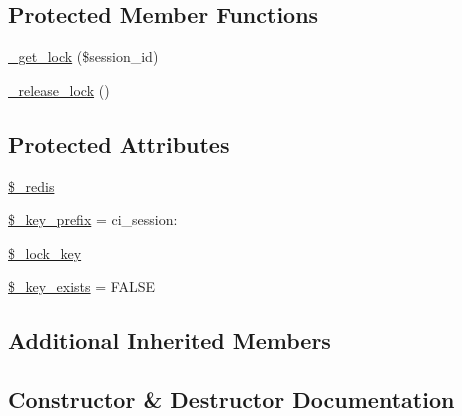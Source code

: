 \subsection*{Protected Member Functions}
\begin{DoxyCompactItemize}
\item 
\mbox{\hyperlink{class_c_i___session__redis__driver_a2c49c8e23be3e2aca96a9d20de18ffc2}{\+\_\+get\+\_\+lock}} (\$session\+\_\+id)
\item 
\mbox{\hyperlink{class_c_i___session__redis__driver_a0265e356e6cf1eaba229663c1664c37d}{\+\_\+release\+\_\+lock}} ()
\end{DoxyCompactItemize}
\subsection*{Protected Attributes}
\begin{DoxyCompactItemize}
\item 
\mbox{\hyperlink{class_c_i___session__redis__driver_a36de60a8fcbe3efac91a87577d0728de}{\$\+\_\+redis}}
\item 
\mbox{\hyperlink{class_c_i___session__redis__driver_a177f231cc2eec31d9aa8f50f9ec9b407}{\$\+\_\+key\+\_\+prefix}} = \textquotesingle{}ci\+\_\+session\+:\textquotesingle{}
\item 
\mbox{\hyperlink{class_c_i___session__redis__driver_a79bf61cb0768c7bb23404280ae004fb4}{\$\+\_\+lock\+\_\+key}}
\item 
\mbox{\hyperlink{class_c_i___session__redis__driver_ac440c17ec7ee39042a2f7665870957d3}{\$\+\_\+key\+\_\+exists}} = F\+A\+L\+SE
\end{DoxyCompactItemize}
\subsection*{Additional Inherited Members}


\subsection{Constructor \& Destructor Documentation}
\mbox{\label{class_c_i___session__redis__driver_ac1669c73d53d6f16cf5459a1e84d39c8}} 
